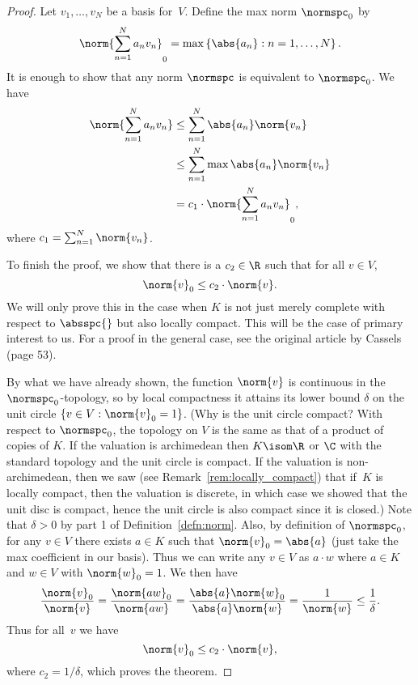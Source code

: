 \begin{proof} 
Let $v_1,\ldots, v_N$ be a basis for~$V$.  Define the max
norm $\normspc_0$ by 
$$
\norm{\sum_{n=1}^N a_n v_n}_0 = \max \left\{\abs{a_n} : n=1,\ldots, N\right\}.
$$
It is enough to show that any norm $\normspc$ is equivalent to
$\normspc_0$.  We have
\begin{align*}
\norm{\sum_{n=1}^N a_n v_n} & \leq
    \sum_{n=1}^N \abs{a_n} \norm{v_n} \\
    &\leq \sum_{n=1}^N \max{\abs{a_n}} \norm{v_n}\\
    & = c_1 \cdot \norm{\sum_{n=1}^N a_n v_n}_0,
\end{align*}
where $c_1 = \sum_{n=1}^N \norm{v_n}$.

To finish the proof, we show that there is a 
$c_2\in \R$ such that for all $v\in V$,
$$
 \norm{v}_0 \leq c_2 \cdot \norm{v}.
$$
We will only prove this in the case when $K$ is not just merely complete
with respect to $\absspc{}$ but also locally compact.  This will 
be the case of primary interest to us.  For a proof in the general case,
see the original article by Cassels (page 53). 

By what we have already shown, the function $\norm{v}$ is continuous
in the $\normspc_0$-topology, so by local compactness it attains its
lower bound $\delta$ on the unit circle $\left\{v\in V :
  \norm{v}_0=1\right\}$.  (Why is the unit circle compact?  With
respect to $\normspc_0$, the topology on $V$ is the same as that of a
product of copies of $K$.  If the valuation is archimedean then
$K\isom \R$ or $\C$ with the standard topology and the unit circle is
compact.  If the valuation is non-archimedean, then we saw (see
Remark~\ref{rem:locally_compact}) that if~$K$ is locally compact, then
the valuation is discrete, in which case we showed that the unit disc
is compact, hence the unit circle is also compact since it is closed.)
Note that $\delta>0$ by part 1 of Definition~\ref{defn:norm}.  Also,
by definition of $\normspc_0$, for any $v\in V$ there exists $a\in K$
such that $\norm{v}_0 = \abs{a}$ (just take the max coefficient in our
basis).  Thus we can write any $v\in V$ as $a\cdot w$ where $a\in K$
and $w\in V$ with $\norm{w}_0=1$.  We then have
$$
\frac{\norm{v}_0}{\norm{v}} = 
\frac{\norm{aw}_0}{\norm{aw}}
= \frac{\abs{a}\norm{w}_0}{\abs{a}\norm{w}}
= \frac{1}{\norm{w}} \leq \frac{1}{\delta}.
$$
Thus for 
all~$v$ we have
$$\norm{v}_0\leq c_2\cdot \norm{v},$$
where $c_2 = 1/\delta$, which proves the theorem. 
\end{proof}


